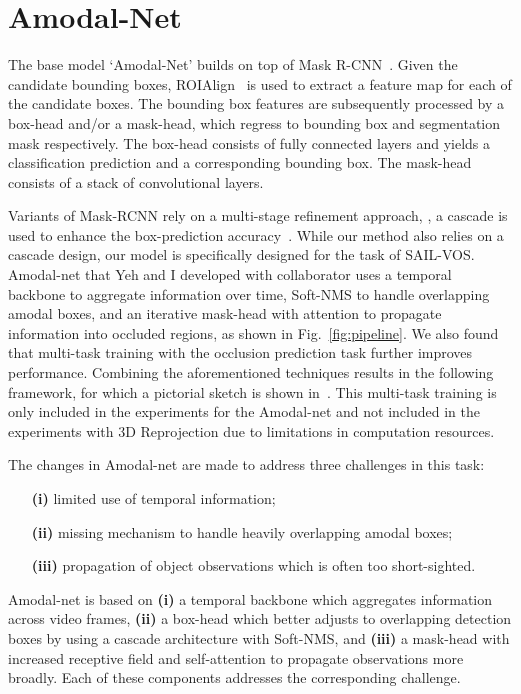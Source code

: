 \section{Amodal-Net}
The base model  `Amodal-Net' builds on top of Mask R-CNN~\cite{he2017mask}. Given the candidate bounding boxes, ROIAlign~\cite{he2017mask} is used to extract a feature map for each of the candidate boxes. The bounding box features are subsequently processed by a box-head and/or a mask-head, which regress to bounding box and segmentation mask respectively. The box-head consists of fully connected layers and yields a classification prediction and a  corresponding bounding box.  %
The mask-head consists of a stack of convolutional layers. 

Variants of Mask-RCNN rely on a multi-stage refinement approach, \ie, a cascade is used to enhance the box-prediction accuracy~\cite{cai2018cascade, chen2019hybrid}. While our method also relies on a cascade design, our model is specifically designed for the task of SAIL-VOS. Amodal-net that Yeh and I developed with collaborator uses a temporal backbone to aggregate information over time, Soft-NMS to handle overlapping amodal boxes, and an iterative mask-head with attention to propagate information into occluded regions, as shown in Fig.~\ref{fig:pipeline}. We also found that multi-task training with the occlusion prediction task further improves performance. Combining the aforementioned techniques results in the following framework, for which a pictorial sketch is shown in~. This multi-task training is only included in the experiments for the Amodal-net and not included in the experiments with 3D Reprojection due to limitations in computation resources.

The changes in Amodal-net are made to address three challenges in this task: 
\begin{enumerate}
    \item[\bf (i)] limited use of temporal information;
    \item[\bf (ii)] missing mechanism to handle heavily overlapping amodal boxes; 
    \item[\bf (iii)] propagation of object observations which is often too short-sighted. 
\end{enumerate}

Amodal-net is based on {\bf (i)} a temporal backbone which aggregates information across video frames, {\bf (ii)} a box-head which 
better adjusts to overlapping detection boxes by using a cascade architecture with  Soft-NMS, 
and {\bf (iii)} a mask-head with increased receptive field and self-attention to propagate observations more broadly. Each of these components addresses the corresponding  challenge. 

